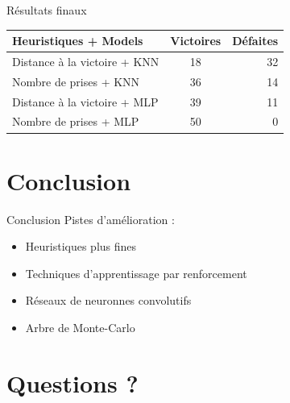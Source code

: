 \documentclass{beamer}
\begin{document}
\begin{frame}{Résultats finaux}
    \begin{center}
        \begin{tabular}{ | l || c | r |}
            \hline 
            Heuristiques + Models & Victoires & Défaites \\
            \hline 
            \hline 
            Distance à la victoire + KNN & 18 & 32 \\
            Nombre de prises + KNN & 36 & 14 \\
            Distance à la victoire + MLP & 39 & 11 \\
            Nombre de prises + MLP & 50 & 0 \\ \hline
        \end{tabular}

    \end{center}
\end{frame}


{\section*{Conclusion}}

\begin{frame}{Conclusion}
    Pistes d'amélioration : 
    \begin{itemize}
        \item Heuristiques plus fines
        \item Techniques d'apprentissage par renforcement
        \item Réseaux de neuronnes convolutifs
        \item Arbre de Monte-Carlo
    \end{itemize}
\end{frame}

\appendix

{\section*{Questions ?}}
\end{document}
